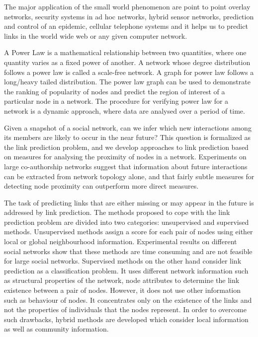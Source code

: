 The major application of the small world phenomenon are point to point overlay networks, security systems in ad hoc networks, hybrid sensor networks, prediction and control of an epidemic, cellular telephone systems and it helps us to predict links in the world wide web or any given computer network.


A Power Law is a mathematical relationship between two quantities, where one quantity varies as a fixed power of another. A network whose degree distribution follows a power law is called a scale-free network. A graph for power law follows a long/heavy tailed distribution. The power law graph can be used to demonstrate the ranking of popularity of nodes and predict the region of interest of a particular node in a network. The procedure for verifying power law for a network is a dynamic approach, where data are analysed over a period of time.


Given a snapshot of a social network, can we infer which new interactions among its members are likely to occur in the near future? This question is formalized as the link prediction problem, and we develop approaches to link prediction based on measures for analysing the proximity of nodes in a network. Experiments on large co-authorship networks suggest that information about future interactions can be extracted from network topology alone, and that fairly subtle measures for detecting node proximity can outperform more direct measures.

The task of predicting links that are either missing or may appear in the future is addressed by link prediction. The methods proposed to cope with the link prediction problem are divided into two categories: unsupervised and supervised methods. Unsupervised methods assign a score for each pair of nodes using either local or global neighbourhood information. Experimental results on different social networks show that these methods are time consuming and are not feasible for large social networks. Supervised methods on the other hand consider link prediction as a classification problem. It uses different network information such as structural properties of the network, node attributes to determine the link existence between a pair of nodes. However, it does not use other information such as behaviour of nodes. It concentrates only on the existence of the links and not the properties of individuals that the nodes represent. In order to overcome such drawbacks, hybrid methods are developed which consider local information as well as community information.

